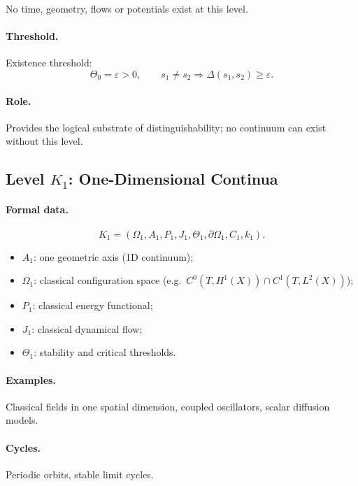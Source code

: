 No time, geometry, flows or potentials exist at this level.

\paragraph{Threshold.}
Existence threshold:
\[
   \Theta_0 = \varepsilon > 0,
   \qquad
   s_1 \neq s_2 \Rightarrow \Delta(s_1,s_2) \ge \varepsilon.
\]

\paragraph{Role.}
Provides the logical substrate of distinguishability;  
no continuum can exist without this level.


\subsection{Level \texorpdfstring{\texorpdfstring{$K_1$}{K\_1}}{K1}: One-Dimensional Continua}

\paragraph{Formal data.}
\[
    K_1 = (\Omega_1, A_1, P_1, J_1, \Theta_1,
           \partial\Omega_1, C_1, k_1).
\]

\begin{itemize}
    \item \(A_1\): one geometric axis (1D continuum);
    \item \(\Omega_1\): classical configuration space
          (e.g.\ \(C^0(T,H^1(X))\cap C^1(T,L^2(X))\));
    \item \(P_1\): classical energy functional;
    \item \(J_1\): classical dynamical flow;
    \item \(\Theta_1\): stability and critical thresholds.
\end{itemize}

\paragraph{Examples.}
Classical fields in one spatial dimension, coupled oscillators,
scalar diffusion models.

\paragraph{Cycles.}
Periodic orbits, stable limit cycles.



